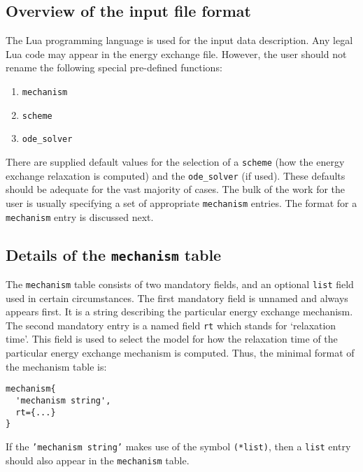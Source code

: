 \subsection{Overview of the input file format}
The Lua programming language is used for the input data description.
Any legal Lua code may appear in the energy exchange file.
However, the user should not rename the following special
pre-defined functions:
\begin{enumerate}
\item \texttt{mechanism}
\item \texttt{scheme}
\item \texttt{ode\_solver}
\end{enumerate}

There are supplied default values for the selection of a \texttt{scheme}
(how the energy exchange relaxation is computed) and the \texttt{ode\_solver}
(if used).
These defaults should be adequate for the vast majority of cases.
The bulk of the work for the user is usually specifying a set of
appropriate \texttt{mechanism} entries.
The format for a \texttt{mechanism} entry is discussed next.

\subsection{Details of the \texttt{mechanism} table}
The \texttt{mechanism} table consists of two mandatory fields, and an optional
\texttt{list} field used in certain circumstances.
The first mandatory field is unnamed and always appears first.
It is a string describing the particular energy exchange mechanism.
The second mandatory entry is a named field \texttt{rt} which stands for
`relaxation time'.
This field is used to select the model for how the relaxation time
of the particular energy exchange mechanism is computed.
Thus, the minimal format of the mechanism table is:
\begin{verbatim}
mechanism{
  'mechanism string',
  rt={...}
}
\end{verbatim}
If the \texttt{'mechanism string'} makes use of the symbol \texttt{(*list)},
then a \texttt{list} entry should also appear in the \texttt{mechanism} table.

